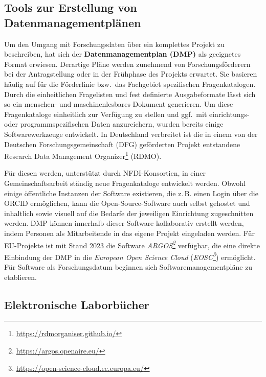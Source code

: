 \documentclass[
  11pt,
  letterpaper,
  DIV=11,
  twoside]{scrreprt}
\DeclareRobustCommand{\href}[2]{#2\footnote{\url{#1}}}
\begin{document}
\subsection{Tools zur Erstellung von
Datenmanagementplänen}\label{tools-zur-erstellung-von-datenmanagementpluxe4nen}

Um den Umgang mit Forschungsdaten über ein komplettes Projekt zu
beschreiben, hat sich der \textbf{Datenmanagementplan ({DMP})} als
geeignetes Format erwiesen. Derartige Pläne werden zunehmend von
Forschungsförderern bei der Antragstellung oder in der Frühphase des
Projekts erwartet. Sie basieren häufig auf für die Förderlinie bzw.~das
Fachgebiet spezifischen Fragenkatalogen. Durch die einheitlichen
Fragelisten und fest definierte Ausgabeformate lässt sich so ein
menschen- und maschinenlesbares Dokument generieren. Um diese
Fragenkataloge einheitlich zur Verfügung zu stellen und ggf.~mit
einrichtungs- oder programmspezifischen Daten anzureichern, wurden
bereits einige Softwarewerkzeuge entwickelt. In Deutschland verbreitet
ist die in einem von der Deutschen Forschungsgemeinschaft (DFG)
geförderten Projekt entstandene
\href{https://rdmorganiser.github.io/}{Research Data Management
Organizer} (RDMO).

Für diesen werden, unterstützt durch {NFDI}-Konsortien, in einer
Gemeinschaftsarbeit ständig neue Fragenkataloge entwickelt werden.
Obwohl einige öffentliche Instanzen der Software existieren, die z.\,B.
einen Login über die {ORCID} ermöglichen, kann die Open-Source-Software
auch selbst gehostet und inhaltlich sowie visuell auf die Bedarfe der
jeweiligen Einrichtung zugeschnitten werden. {DMP} können innerhalb
dieser Software kollaborativ erstellt werden, indem Personen als
Mitarbeitende in das eigene Projekt eingeladen werden. Für EU-Projekte
ist mit Stand 2023 die Software
\emph{\href{https://argos.openaire.eu/}{ARGOS}} verfügbar, die eine
direkte Einbindung der {DMP} in die \emph{European Open Science Cloud}
(\emph{\href{https://open-science-cloud.ec.europa.eu/}{EOSC}})
ermöglicht. Für Software als Forschungsdatum beginnen sich
Softwaremanagementpläne zu etablieren.

\subsection{Elektronische
Laborbücher}\label{elektronische-laborbuxfccher}
\end{document}
